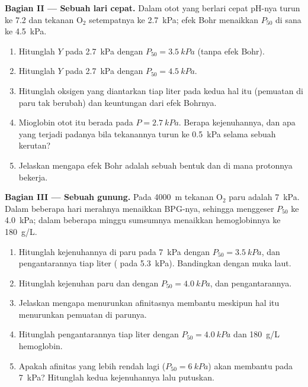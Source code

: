 \begin{problem}
\medskip
\noindent\textbf{Bagian II --- Sebuah lari cepat.}
Dalam otot yang berlari cepat pH-nya turun ke 7.2 dan tekanan
$\mathrm{O_2}$ setempatnya ke \qty{2.7}{kPa}; efek Bohr menaikkan
$P_{50}$ di sana ke \qty{4.5}{kPa}.
\begin{enumerate}[resume]
  \item Hitunglah $Y$ pada \qty{2.7}{kPa} dengan
        $P_{50} = \qty{3.5}{kPa}$ (tanpa efek Bohr).
  \item Hitunglah $Y$ pada \qty{2.7}{kPa} dengan
        $P_{50} = \qty{4.5}{kPa}$.
  \item Hitunglah oksigen yang diantarkan tiap liter pada kedua hal itu
        (pemuatan di paru tak berubah) dan keuntungan dari efek
        Bohrnya.
  \item Mioglobin otot itu berada pada $P = \qty{2.7}{kPa}$. Berapa
        kejenuhannya, dan apa yang terjadi padanya bila tekanannya
        turun ke \qty{0.5}{kPa} selama sebuah kerutan?
  \item Jelaskan mengapa efek Bohr adalah sebuah bentuk  dan di
        mana protonnya bekerja.
\end{enumerate}

\medskip
\noindent\textbf{Bagian III --- Sebuah gunung.}
Pada \qty{4000}{m} tekanan $\mathrm{O_2}$ paru adalah \qty{7}{kPa}.
Dalam beberapa hari  merahnya menaikkan BPG-nya, sehingga menggeser
$P_{50}$ ke \qty{4.0}{kPa}; dalam beberapa minggu sumsumnya menaikkan
hemoglobinnya ke
\qty{180}{g/L}.
\begin{enumerate}[resume]
  \item Hitunglah kejenuhannya di paru pada \qty{7}{kPa} dengan
        $P_{50} = \qty{3.5}{kPa}$, dan pengantarannya tiap liter
        ( pada \qty{5.3}{kPa}). Bandingkan dengan muka laut.
  \item Hitunglah kejenuhan paru dan  dengan
        $P_{50} = \qty{4.0}{kPa}$, dan pengantarannya.
  \item Jelaskan mengapa menurunkan afinitasnya membantu meskipun hal
        itu menurunkan pemuatan di parunya.
  \item Hitunglah pengantarannya tiap liter dengan
        $P_{50} = \qty{4.0}{kPa}$ dan \qty{180}{g/L} hemoglobin.
  \item Apakah afinitas yang lebih rendah lagi ($P_{50} = \qty{6}{kPa}$)
        akan membantu pada \qty{7}{kPa}? Hitunglah kedua kejenuhannya
        lalu putuskan.
\end{enumerate}


\end{problem}
